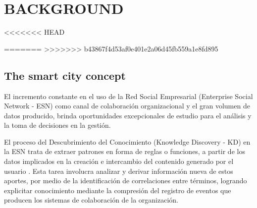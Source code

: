 \documentclass[a4paper,fleqn,spanish]{cas-dc}
\begin{document}

\lipsum[1-4]


\section{BACKGROUND}\label{marco}

\lipsum[3]

<<<<<<< HEAD

=======
>>>>>>> b43867f4d53af0e401e2a06d45fb559a1e8fd895
\subsection{The smart city concept}\label{concepto}


El incremento constante en el uso de la Red Social Empresarial (Enterprise
Social Network - ESN) \cite{aljowder_systematic_2019} como canal de colaboración
organizacional y el gran volumen de datos producido, brinda oportunidades
excepcionales de estudio para el análisis y la toma de decisiones en la gestión.

El proceso del Descubrimiento del Conocimiento (Knowledge Discovery - KD) en la
ESN trata de extraer patrones en forma de reglas o funciones, a partir de los
datos implicados en la creación e intercambio del contenido generado por el
usuario \cite{wahab_systematic_2020}. Esta tarea involucra analizar y derivar información
nueva de estos aportes, por medio de la identificación de correlaciones entre
términos, logrando explicitar conocimiento mediante la compresión del registro
de eventos que producen los sistemas de colaboración de la organización.
\end{document}
